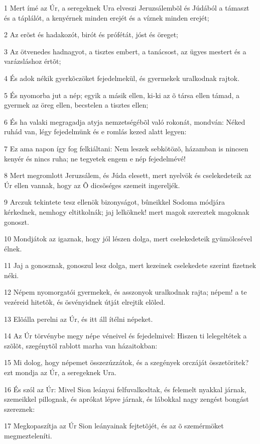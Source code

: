 \par 1 Mert ímé az Úr, a seregeknek Ura elveszi Jeruzsálembõl és Júdából a támaszt és a táplálót, a kenyérnek minden erejét és a víznek minden erejét;
\par 2 Az erõst és hadakozót, birót és prófétát, jóst és öreget;
\par 3 Az ötvenedes hadnagyot, a tisztes embert, a tanácsost, az ügyes mestert és a varázsláshoz értõt;
\par 4 És adok nékik gyerkõczöket fejedelmekül, és gyermekek uralkodnak rajtok.
\par 5 És nyomorba jut a nép; egyik a másik ellen, ki-ki az õ társa ellen támad, a gyermek az öreg ellen, becstelen a tisztes ellen;
\par 6 És ha valaki megragadja atyja nemzetségébõl való rokonát, mondván: Néked ruhád van, légy fejedelmünk és e romlás kezed alatt legyen:
\par 7 Ez ama napon így fog felkiáltani: Nem leszek sebkötözõ, házamban is nincsen kenyér és nincs ruha; ne tegyetek engem e nép fejedelmévé!
\par 8 Mert megromlott Jeruzsálem, és Júda elesett, mert nyelvök és cselekedeteik az Úr ellen vannak, hogy az Õ dicsõséges szemeit ingereljék.
\par 9 Arczuk tekintete tesz ellenök bizonyságot, bûneikkel Sodoma módjára kérkednek, nemhogy eltitkolnák; jaj lelköknek! mert magok szereztek magoknak gonoszt.
\par 10 Mondjátok az igaznak, hogy jól lészen dolga, mert cselekedeteik gyümölcsével élnek.
\par 11 Jaj a gonosznak, gonoszul lesz dolga, mert kezeinek cselekedete szerint fizetnek néki.
\par 12 Népem nyomorgatói gyermekek, és asszonyok uralkodnak rajta; népem! a te vezéreid hitetõk, és ösvényidnek útját elrejtik elõled.
\par 13 Elõálla perelni az Úr, és itt áll ítélni népeket.
\par 14 Az Úr törvénybe megy népe véneivel és fejedelmivel: Hiszen ti lelegeltétek a szõlõt, szegénytõl rablott marha van házaitokban:
\par 15 Mi dolog, hogy népemet összezúzzátok, és a szegények orczáját összetöritek? ezt mondja az Úr, a seregeknek Ura.
\par 16 És szól az Úr: Mivel Sion leányai felfuvalkodtak, és felemelt nyakkal járnak, szemeikkel pillognak, és aprókat lépve járnak, és lábokkal nagy zengést bongást szereznek:
\par 17 Megkopaszítja az Úr Sion leányainak fejtetõjét, és az õ szemérmöket megmezteleníti.
